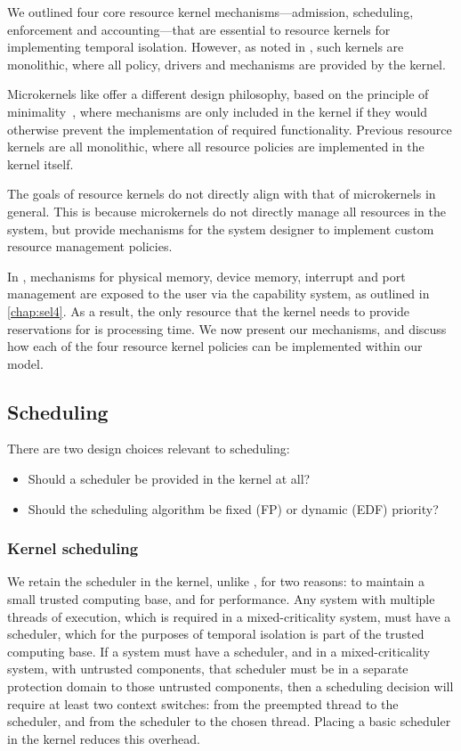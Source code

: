 We outlined four core resource kernel mechanisms---admission, scheduling, enforcement and
accounting---that are essential to resource kernels for implementing temporal isolation.  However,
as noted in , such kernels are monolithic, where all policy, drivers and
mechanisms are provided by the kernel.

Microkernels like \selfour offer a different design philosophy, based on the principle of
minimality~\citep{Liedtke_95}, where mechanisms are only included in the kernel if they would
otherwise prevent the implementation of required functionality. Previous resource kernels
are all monolithic, where all resource policies are implemented in the kernel itself.

The goals of resource kernels do not directly align with that of microkernels in general.  This is
because microkernels do not directly manage all resources in the system, but provide mechanisms for
the system designer to implement custom resource management policies.  

In \selfour, mechanisms for physical memory, device memory, interrupt and \IO port management are
exposed to the user via the capability system, as outlined in \cref{chap:sel4}. As a result, the
only resource that the kernel needs to provide reservations for is processing time.  We now present
our mechanisms, and discuss how each of the four resource kernel policies can be implemented within our model.

\subsection{Scheduling}
\label{sec:model-scheduling}

There are two design choices relevant to scheduling:

\begin{itemize} 
    \item Should a scheduler be provided in the kernel at all? 
    \item Should the scheduling algorithm be fixed (\gls{FP}) or dynamic (\gls{EDF}) priority?
\end{itemize}

\subsubsection{Kernel scheduling}

We retain the scheduler in the kernel, unlike \composite, for two reasons: to maintain a small
trusted computing base, and for performance. Any system with multiple threads of execution, which is
required in a mixed-criticality system, must have a scheduler, which for the purposes of temporal isolation 
is part of the trusted computing base. If a system must have a scheduler, and in a mixed-criticality
system, with untrusted components, that scheduler must be in a separate protection domain to those
untrusted components, then a scheduling decision will require at least two context switches: from
the preempted thread to the scheduler, and from the scheduler to the chosen thread. Placing a basic
scheduler in the kernel reduces this overhead. 

